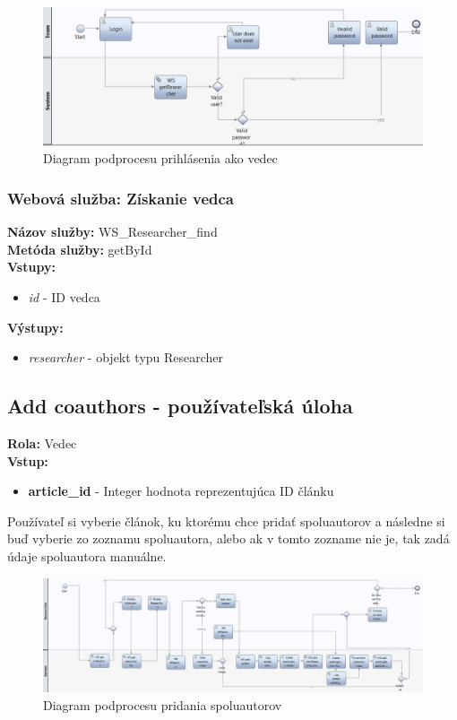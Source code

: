 \documentclass[10pt,oneside,slovak,a4paper]{article}
\begin{document}
\begin{figure} [H]
\centering
\includegraphics[scale=0.4]{diagrams/diagLoginResearcher.jpg} 
\caption{Diagram podprocesu prihlásenia ako vedec}
\end{figure}

\subsubsection{Webová služba: Získanie vedca}
\textbf{Názov služby:} WS\_Researcher\_find\\
\textbf{Metóda služby:} getById\\
\textbf{Vstupy:}
	\begin{itemize}
		\item \textit{id} - ID vedca
	\end{itemize}
\textbf{Výstupy:}
	\begin{itemize}
		\item \textit{researcher} - objekt typu Researcher
	\end{itemize}

\subsection{Add coauthors - používateľská úloha}
\textbf{Rola:} Vedec\\
\textbf{Vstup:}

\begin{itemize}
\item \textbf{article\_id} - Integer hodnota reprezentujúca ID článku
\end{itemize}

Používateľ si vyberie článok, ku ktorému chce pridať spoluautorov a následne si buď vyberie zo zoznamu spoluautora, alebo ak v tomto zozname nie je, tak zadá údaje spoluautora manuálne.

\begin{figure} [H]
\centering
\includegraphics[scale=0.4]{diagrams/diagAddCoauthors.jpg} 
\caption{Diagram podprocesu pridania spoluautorov}
\end{figure}
\end{document}
